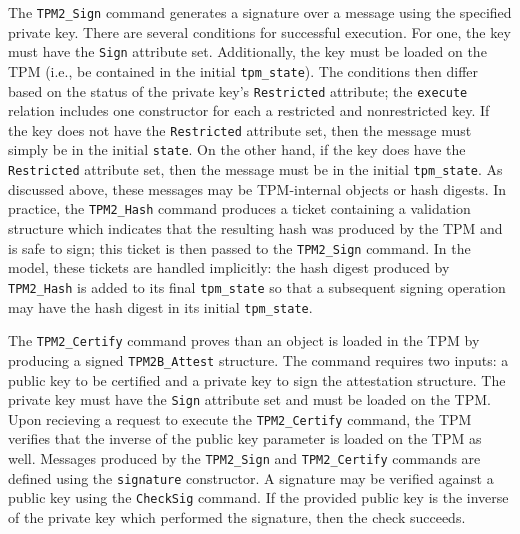 The \verb|TPM2_Sign| command generates a signature over a message using the specified private key. There are several conditions for successful execution. For one, the key must have the \verb|Sign| attribute set. Additionally, the key must be loaded on the TPM (i.e., be contained in the initial \verb|tpm_state|). The conditions then differ based on the status of the private key's \verb|Restricted| attribute; the \verb|execute| relation includes one constructor for each a restricted and nonrestricted key. If the key does not have the \verb|Restricted| attribute set, then the message must simply be in the initial \verb|state|. On the other hand, if the key does have the \verb|Restricted| attribute set, then the message must be in the initial \verb|tpm_state|. As discussed above, these messages may be TPM-internal objects or hash digests. In practice, the \verb|TPM2_Hash| command produces a ticket containing a validation structure which indicates that the resulting hash was produced by the TPM and is safe to sign; this ticket is then passed to the \verb|TPM2_Sign| command. In the model, these tickets are handled implicitly: the hash digest produced by \verb|TPM2_Hash| is added to its final \verb|tpm_state| so that a subsequent signing operation may have the hash digest in its initial \verb|tpm_state|. 

The \verb|TPM2_Certify| command proves than an object is loaded in the TPM by producing a signed \verb|TPM2B_Attest| structure. The command requires two inputs: a public key to be certified and a private key to sign the attestation structure. The private key must have the \verb|Sign| attribute set and must be loaded on the TPM. Upon recieving a request to execute the \verb|TPM2_Certify| command, the TPM verifies that the inverse of the public key parameter is loaded on the TPM as well. Messages produced by the \verb|TPM2_Sign| and \verb|TPM2_Certify| commands are defined using the \verb|signature| constructor. A signature may be verified against a public key using the \verb|CheckSig| command. If the provided public key is the inverse of the private key which performed the signature, then the check succeeds.


